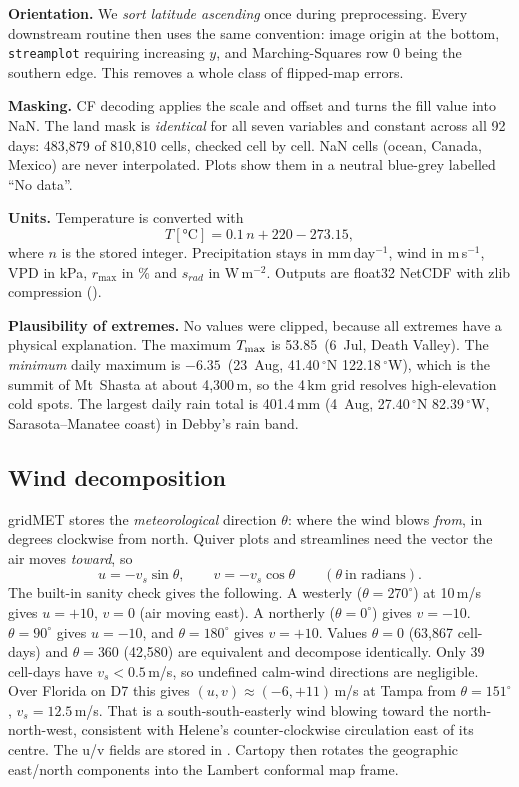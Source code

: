 \textbf{Orientation.} We \emph{sort latitude ascending} once during preprocessing. Every downstream routine then uses
the same convention: image origin at the bottom, \texttt{streamplot} requiring increasing $y$, and Marching-Squares row
0 being the southern edge. This removes a whole class of flipped-map errors.

\textbf{Masking.} CF decoding applies the scale and offset and turns the fill value into NaN. The land mask is
\emph{identical} for all seven variables and constant across all 92 days: 483,879 of 810,810 cells, checked cell by cell.
NaN cells (ocean, Canada, Mexico) are never interpolated. Plots show them in a neutral blue-grey labelled ``No data''.

\textbf{Units.} Temperature is converted with
\begin{equation}
T[\si{\celsius}] = 0.1\,n + 220 - 273.15,
\end{equation}
where $n$ is the stored integer. Precipitation stays in mm\,day$^{-1}$, wind in m\,s$^{-1}$, VPD in kPa, $r_{\max}$ in \%
and $s_{rad}$ in W\,m$^{-2}$. Outputs are float32 NetCDF with zlib compression
().

\textbf{Plausibility of extremes.} No values were clipped, because all extremes have a physical explanation. The maximum
$T_{\max}$ is 53.85\,\degC{} (6~Jul, Death Valley). The \emph{minimum} daily maximum is $-6.35$\,\degC{} (23~Aug,
41.40\,$^\circ$N 122.18\,$^\circ$W), which is the summit of Mt~Shasta at about 4,300\,m, so the 4\,km grid resolves
high-elevation cold spots. The largest daily rain total is 401.4\,mm (4~Aug, 27.40\,$^\circ$N 82.39\,$^\circ$W, Sarasota--Manatee
coast) in Debby's rain band.

\subsection{Wind decomposition}
gridMET stores the \emph{meteorological} direction $\theta$: where the wind blows \emph{from}, in degrees clockwise from
north. Quiver plots and streamlines need the vector the air moves \emph{toward}, so
\begin{equation}
u = -v_s\sin\theta,\qquad v = -v_s\cos\theta \qquad(\theta\ \text{in radians}).
\label{eq:wind}
\end{equation}
The built-in sanity check gives the following. A westerly ($\theta=270^\circ$) at 10\,m/s gives $u=+10$, $v=0$ (air
moving east). A northerly ($\theta=0^\circ$) gives $v=-10$. $\theta=90^\circ$ gives $u=-10$, and $\theta=180^\circ$ gives
$v=+10$. Values $\theta=0$ (63,867 cell-days) and $\theta=360$ (42,580) are equivalent and decompose identically. Only 39
cell-days have $v_s<0.5$\,m/s, so undefined calm-wind directions are negligible. Over Florida on D7 this gives
$(u,v)\approx(-6,+11)$\,m/s at Tampa from $\theta=151^\circ$, $v_s=12.5$\,m/s. That is a south-south-easterly wind blowing
toward the north-north-west, consistent with Helene's counter-clockwise circulation east of its centre. The u/v fields are
stored in . Cartopy then rotates the geographic east/north components into the Lambert
conformal map frame.

